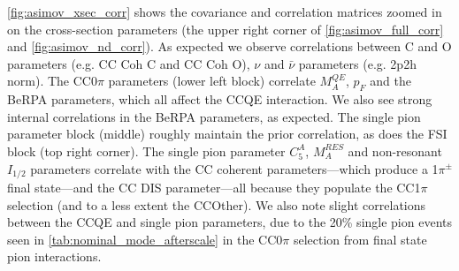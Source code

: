 \autoref{fig:asimov_xsec_corr} shows the covariance and correlation matrices zoomed in on the cross-section parameters (the upper right corner of \autoref{fig:asimov_full_corr} and \autoref{fig:asimov_nd_corr}). As expected we observe correlations between C and O parameters (e.g. CC Coh C and CC Coh O), $\nu$ and $\bar{\nu}$ parameters (e.g. 2p2h norm). The CC0$\pi$ parameters (lower left block) correlate $M_A^{QE}$, $p_F$ and the BeRPA parameters, which all affect the CCQE interaction. We also see strong internal correlations in the BeRPA parameters, as expected. The single pion parameter block (middle) roughly maintain the prior correlation, as does the FSI block (top right corner). The single pion parameter $C_5^A$, $M_A^{RES}$ and non-resonant $I_{1/2}$ parameters correlate with the CC coherent parameters---which produce a 1$\pi^\pm$ final state---and the CC DIS parameter---all because they populate the CC1$\pi$ selection (and to a less extent the CCOther). We also note slight correlations between the CCQE and single pion parameters, due to the 20\% single pion events seen in \autoref{tab:nominal_mode_afterscale} in the CC0$\pi$ selection from final state pion interactions.

